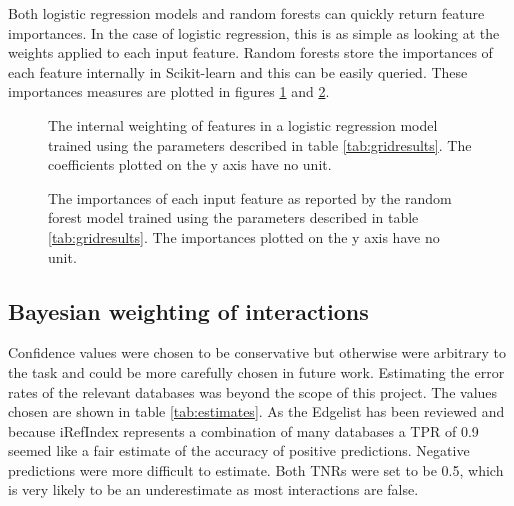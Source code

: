 Both logistic regression models and random forests can quickly return feature importances.
In the case of logistic regression, this is as simple as looking at the weights applied to each input feature.
Random forests store the importances of each feature internally in Scikit-learn and this can be easily queried.
These importances measures are plotted in figures \ref{fig:logregweights} and \ref{fig:rfimportances}.

\begin{figure}
    \centering
    \setlength\figureheight{2in}
    \setlength\figurewidth{3in}
    \caption{The internal weighting of features in a logistic regression model trained using the parameters described in table \ref{tab:gridresults}. The coefficients plotted on the y axis have no unit.}
    \label{fig:logregweights}
\end{figure}

\begin{figure}
    \centering
    \setlength\figureheight{2in}
    \setlength\figurewidth{3in}
    \caption{The importances of each input feature as reported by the random forest model trained using the parameters described in table \ref{tab:gridresults}. The importances plotted on the y axis have no unit.}
    \label{fig:rfimportances}
\end{figure}

\subsection{Bayesian weighting of interactions}
\label{bayesresults}

Confidence values were chosen to be conservative but otherwise were arbitrary to the task and could be more carefully chosen in future work.
Estimating the error rates of the relevant databases was beyond the scope of this project.
The values chosen are shown in table \ref{tab:estimates}.
As the Edgelist has been reviewed and because iRefIndex represents a combination of many databases a TPR of 0.9 seemed like a fair estimate of the accuracy of positive predictions.
Negative predictions were more difficult to estimate.
Both TNRs were set to be 0.5, which is very likely to be an underestimate as most interactions are false.

